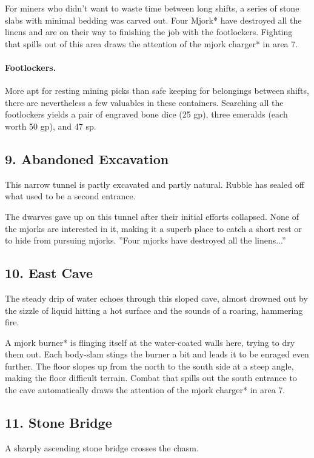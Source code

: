 \documentclass[10pt,a4paper,twoside,twocolumn,openany,bg=print,nodeprecatedcode]{dndbook}
\begin{document}
For miners who didn't want to waste time between long shifts, a series of stone slabs with minimal bedding was carved out. Four Mjork* have destroyed all the linens and are on their way to finishing the job with the footlockers. Fighting that spills out of this area draws the attention of the mjork charger* in area 7.
\paragraph{Footlockers.}
More apt for resting mining picks than safe keeping for belongings between shifts, there are nevertheless a few valuables in these containers. Searching all the footlockers yields a pair of engraved bone dice (25 gp), three emeralds (each worth 50 gp), and 47 sp.
\subsection{9. Abandoned Excavation}
\begin{DndReadAloud}{}
This narrow tunnel is partly excavated and partly natural. Rubble has sealed off what used to be a second entrance.
\end{DndReadAloud}

The dwarves gave up on this tunnel after their initial efforts collapsed. None of the mjorks are interested in it, making it a superb place to catch a short rest or to hide from pursuing mjorks.
\DndQuote%
{}
{''Four mjorks have destroyed all the linens...''}
{}
\subsection{10. East Cave}
\begin{DndReadAloud}{}
The steady drip of water echoes through this sloped cave, almost drowned out by the sizzle of liquid hitting a hot surface and the sounds of a roaring, hammering fire.
\end{DndReadAloud}

A mjork burner* is flinging itself at the water-coated walls here, trying to dry them out. Each body-slam stings the burner a bit and leads it to be enraged even further. The floor slopes up from the north to the south side at a steep angle, making the floor difficult terrain. Combat that spills out the south entrance to the cave automatically draws the attention of the mjork charger* in area 7.
\subsection{11. Stone Bridge}
\begin{DndReadAloud}{}
A sharply ascending stone bridge crosses the chasm.
\end{DndReadAloud}
\end{document}
